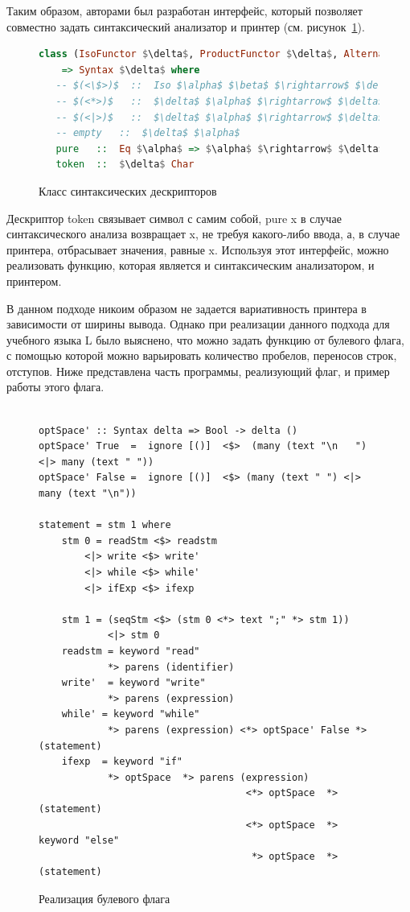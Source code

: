 \documentclass{matmex-diploma-custom}
\begin{document}
Таким образом, авторами был разработан интерфейс, который позволяет совместно задать синтаксический анализатор и принтер (см. рисунок~\ref{КлассСинтДеск}).
\begin{figure}[ht]
\centering
\begin{lstlisting}[mathescape,language = haskell]
class (IsoFunctor $\delta$, ProductFunctor $\delta$, Alternative $\delta$) 
    => Syntax $\delta$ where
   -- $(<\$>)$  ::  Iso $\alpha$ $\beta$ $\rightarrow$ $\delta$ $\alpha$ $\rightarrow$ $\delta$ $\beta$
   -- $(<*>)$   ::  $\delta$ $\alpha$ $\rightarrow$ $\delta$ $\beta$ $\rightarrow$ $\delta$ ($\alpha$, $\beta$)
   -- $(<|>)$   ::  $\delta$ $\alpha$ $\rightarrow$ $\delta$ $\alpha$ $\rightarrow$ $\delta$ $\alpha$
   -- empty   ::  $\delta$ $\alpha$
   pure   ::  Eq $\alpha$ => $\alpha$ $\rightarrow$ $\delta$ $\alpha$
   token  ::  $\delta$ Char
\end{lstlisting}
\caption{Класс синтаксических дескрипторов}
\label{КлассСинтДеск}
\end{figure}

Дескриптор token связывает символ с самим собой, pure x в случае синтаксического анализа возвращает x, не требуя какого-либо ввода, а, в случае принтера, отбрасывает значения, равные x. Используя этот интерфейс, можно реализовать функцию, которая является и синтаксическим анализатором, и принтером.

В данном подходе никоим образом не задается вариативность принтера в зависимости от ширины вывода. Однако при реализации данного подхода для учебного языка L было выяснено, что можно задать функцию от булевого флага, с помощью которой можно варьировать количество пробелов, переносов строк, отступов. Ниже представлена часть программы, реализующий флаг, и пример работы этого флага. 


\begin{figure}[ht]
\centering
\begin{verbatim}

optSpace' :: Syntax delta => Bool -> delta ()
optSpace' True  =  ignore [()]  <$>  (many (text "\n   ") <|> many (text " "))
optSpace' False =  ignore [()]  <$> (many (text " ") <|> many (text "\n"))

statement = stm 1 where
    stm 0 = readStm <$> readstm
        <|> write <$> write'
        <|> while <$> while'
        <|> ifExp <$> ifexp

    stm 1 = (seqStm <$> (stm 0 <*> text ";" *> stm 1))
	        <|> stm 0
    readstm = keyword "read"
            *> parens (identifier)
    write'  = keyword "write"		  
            *> parens (expression)
    while' = keyword "while"
            *> parens (expression) <*> optSpace' False *> (statement)
    ifexp  = keyword "if"
            *> optSpace  *> parens (expression)
                                    <*> optSpace  *> (statement) 
                                    <*> optSpace  *> keyword "else"  
                                     *> optSpace  *> (statement)	

\end{verbatim}
\caption{Реализация булевого флага}
\label{БулФлаг1}
\end{figure}
\end{document}
